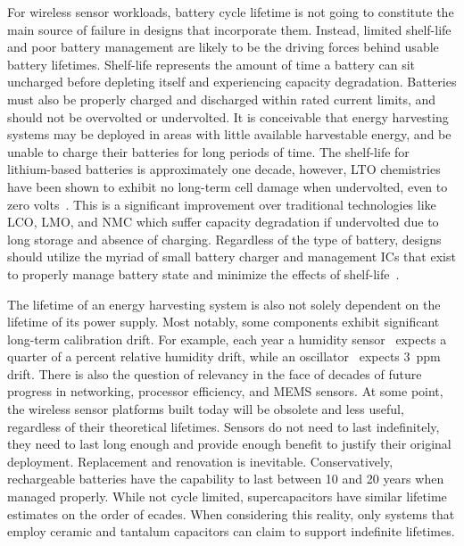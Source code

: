 For wireless sensor workloads, battery cycle lifetime is not going to constitute the main source of failure in designs that incorporate them. Instead, limited shelf-life and poor battery management are likely to be the driving forces behind usable battery lifetimes. 
Shelf-life represents the amount of time a battery can sit uncharged before depleting itself and experiencing capacity degradation. Batteries must also be properly charged and discharged within rated current limits, and should not be overvolted or undervolted. 
It is conceivable that energy harvesting systems may be deployed in areas with little available harvestable energy, and be unable to charge their batteries for long periods of time. 
The shelf-life for lithium-based batteries is approximately one decade, however, LTO chemistries have been shown to exhibit no long-term cell
damage when undervolted, even to zero volts~\cite{brunell2016effect}.
This is a significant improvement over traditional technologies like LCO, LMO, and NMC which suffer capacity degradation if undervolted due to long storage and absence of charging. 
Regardless of the type of battery, designs should utilize the myriad of small battery charger and management ICs that exist to properly manage battery state and minimize the effects of shelf-life~\cite{ltc4071Datasheet,bq25505,adp5091}.

The lifetime of an energy harvesting system is also not solely dependent on the lifetime of its power supply.
Most notably, some components exhibit significant long-term calibration drift. For example, each year a humidity sensor~\cite{si7021} expects a quarter of a percent relative humidity drift, while an oscillator~\cite{txc-oscillator} expects 3~ppm drift.
There is also the question of relevancy in the face of decades of future
progress in networking, processor efficiency, and MEMS sensors. At some point, the wireless sensor platforms built today
will be obsolete and less useful, regardless of their theoretical lifetimes. Sensors do not need to last indefinitely, they need to last long enough and provide enough
benefit to justify their original deployment. Replacement and renovation is inevitable.
Conservatively, rechargeable batteries have the capability to last between 10 and 20 years when managed properly. While not cycle limited, supercapacitors have similar lifetime estimates on the order of ecades. 
When considering this reality, only systems that employ ceramic and tantalum capacitors can claim to support indefinite lifetimes. 

